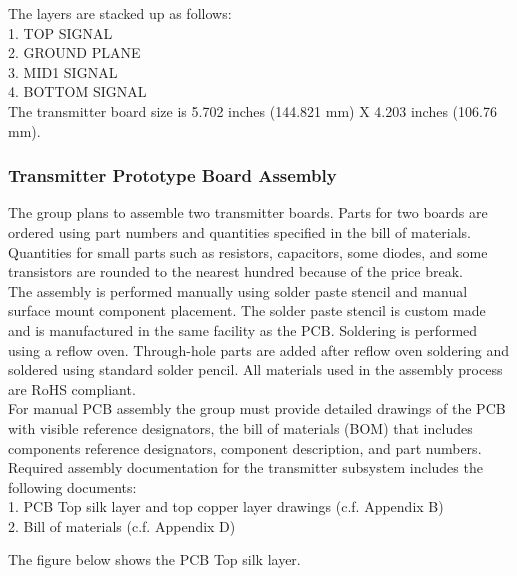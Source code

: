 \documentclass[12pt]{article}
\begin{document}
 \hfill
 \pagebreak
 \hfill
 
 \noindent
The layers are stacked up as follows:\\
1. TOP SIGNAL\\
2. GROUND PLANE\\
3. MID1 SIGNAL\\
4. BOTTOM SIGNAL\\
 
 \noindent
The transmitter board size is  5.702 inches (144.821 mm) X 4.203 inches (106.76 mm).\\

\subsubsection{Transmitter Prototype Board Assembly} The group plans to assemble two transmitter boards. Parts for two boards are ordered using part numbers and quantities specified in the bill of materials. Quantities for small parts such as resistors, capacitors, some diodes, and some transistors are rounded to the nearest hundred because of the price break.\\

\indent
The assembly is performed manually using solder paste stencil and manual surface mount component placement. The solder paste stencil is custom made and is manufactured in the same facility as the PCB. Soldering is performed using a reflow oven. Through-hole parts are added after reflow oven soldering and soldered using standard solder pencil. All materials used in the assembly process are RoHS compliant.\\

\indent
For manual PCB assembly the group must provide detailed drawings of the PCB with visible reference designators, the bill of materials (BOM)  that includes components reference designators, component description, and part numbers.\\
 
\noindent
Required assembly documentation for the transmitter subsystem includes the following documents:\\
1. PCB Top silk layer and top copper layer drawings (c.f. Appendix B)\\
2. Bill of materials (c.f. Appendix D)\\

\hfill
\pagebreak
\hfill
 
 \indent
The figure below shows the PCB Top silk layer.
\end{document}
